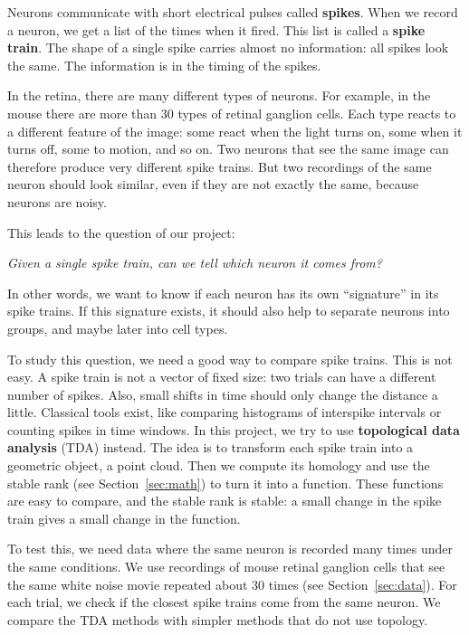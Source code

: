 \documentclass[11pt,a4paper]{article}
\begin{document}
Neurons communicate with short electrical pulses called \textbf{spikes}. When we record a neuron, we get a list of the times when it fired. This list is called a \textbf{spike train}. The shape of a single spike carries almost no information: all spikes look the same. The information is in the timing of the spikes.

In the retina, there are many different types of neurons. For example, in the mouse there are more than 30 types of retinal ganglion cells. Each type reacts to a different feature of the image: some react when the light turns on, some when it turns off, some to motion, and so on. Two neurons that see the same image can therefore produce very different spike trains. But two recordings of the same neuron should look similar, even if they are not exactly the same, because neurons are noisy.

This leads to the question of our project:
\begin{center}
    \textit{Given a single spike train, can we tell which neuron it comes from?}
\end{center}
In other words, we want to know if each neuron has its own ``signature'' in its spike trains. If this signature exists, it should also help to separate neurons into groups, and maybe later into cell types.

To study this question, we need a good way to compare spike trains. This is not easy. A spike train is not a vector of fixed size: two trials can have a different number of spikes. Also, small shifts in time should only change the distance a little. Classical tools exist, like comparing histograms of interspike intervals or counting spikes in time windows. In this project, we try to use \textbf{topological data analysis} (TDA) instead. The idea is to transform each spike train into a geometric object, a point cloud. Then we compute its homology and use the stable rank (see Section~\ref{sec:math}) to turn it into a function. These functions are easy to compare, and the stable rank is stable: a small change in the spike train gives a small change in the function.

To test this, we need data where the same neuron is recorded many times under the same conditions. We use recordings of mouse retinal ganglion cells that see the same white noise movie repeated about 30 times (see Section~\ref{sec:data}). For each trial, we check if the closest spike trains come from the same neuron. We compare the TDA methods with simpler methods that do not use topology.
\end{document}
